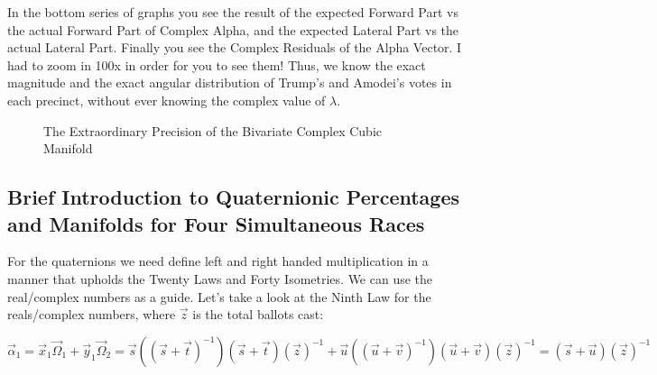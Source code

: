 In the bottom series of graphs you see the result of the expected Forward Part vs the actual Forward Part of Complex Alpha, and the expected Lateral Part vs the actual Lateral Part. Finally you see the Complex Residuals of the Alpha Vector. I had to zoom in 100x in order for you to see them! Thus, we know the exact magnitude and the exact angular distribution of Trump's and Amodei's votes in each precinct, without ever knowing the complex value of $\lambda$.
\begin{figure}[bp!]
\begin{center}
\caption{The Extraordinary Precision of the Bivariate Complex Cubic Manifold}
\noindent{}
\end{center}
\end{figure}
\newpage
\subsection{Brief Introduction to Quaternionic Percentages and Manifolds for Four Simultaneous Races}
For the quaternions we need define left and right handed multiplication in a manner that upholds the Twenty Laws and Forty Isometries. We can use the real/complex numbers as a guide. Let's take a look at the Ninth Law for the reals/complex numbers, where $\vec{z}$ is the total ballots cast:

$$\vec{\alpha}_{1}=\vec{x}_{1}\vec{\Omega}_{1}+\vec{y}_{1}\vec{\Omega}_{2}=\vec{s}\left((\vec{s}+\vec{t})^{-1}\right)(\vec{s}+\vec{t})\left(\vec{z}\right)^{-1}+\vec{u}\left((\vec{u}+\vec{v})^{-1}\right)(\vec{u}+\vec{v})\left(\vec{z}\right)^{-1}=\left(\vec{s}+\vec{u}\right)\left(\vec{z}\right)^{-1}$$

